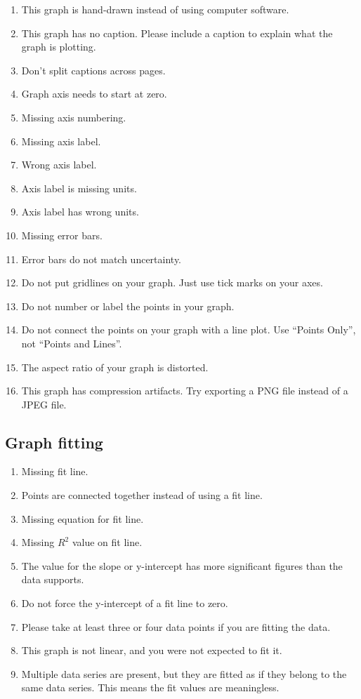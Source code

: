 \documentclass[12pt,letterpaper]{article}
\begin{document}
\begin{multicols}{2}
\begin{enumerate}[start=90]
  \item This graph is hand-drawn instead of using computer software.
  \item This graph has no caption.
    Please include a caption to explain what the graph is plotting.
  \item Don't split captions across pages.
  \item Graph axis needs to start at zero.
  \item Missing axis numbering.
  \item Missing axis label.
  \item Wrong axis label.
  \item Axis label is missing units.
  \item Axis label has wrong units.
  \item Missing error bars.
  \item Error bars do not match uncertainty.
  \item Do not put gridlines on your graph. Just use tick marks on your axes.
  \item Do not number or label the points in your graph.
  \item Do not connect the points on your graph with a line plot.
    Use ``Points Only'', not ``Points and Lines''.
  \item The aspect ratio of your graph is distorted.
  \item This graph has compression artifacts.
    Try exporting a PNG file instead of a JPEG file.
\end{enumerate}

\subsection*{Graph fitting}

\begin{enumerate}[start=110]
  \item Missing fit line.
  \item Points are connected together instead of using a fit line.
  \item Missing equation for fit line.
  \item Missing $R^2$ value on fit line.
  \item The value for the slope or y-intercept
    has more significant figures than the data supports.
  \item Do not force the y-intercept of a fit line to zero.
  \item Please take at least three or four data points
    if you are fitting the data.
  \item This graph is not linear,
    and you were not expected to fit it.
  \item Multiple data series are present,
    but they are fitted as if they belong to the same data series.
    This means the fit values are meaningless.
\end{enumerate}


\end{multicols}
\end{document}
